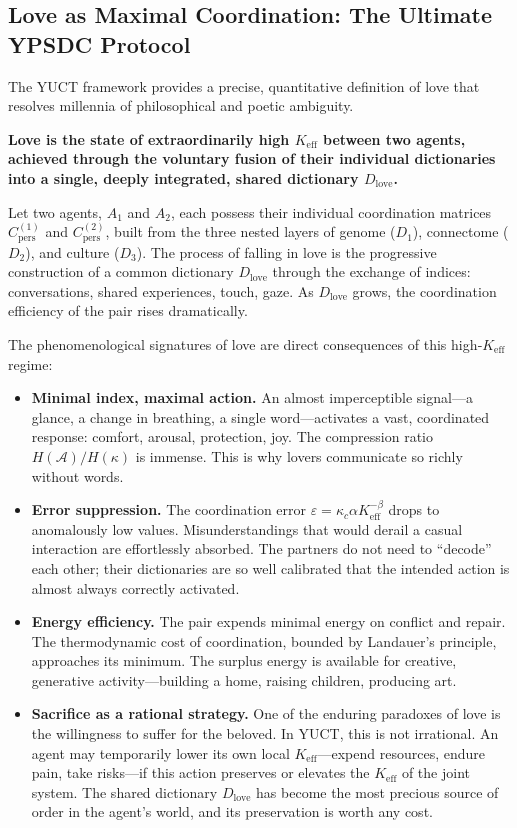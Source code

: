 \documentclass[12pt,a4paper]{article}
\begin{document}
	\subsection{Love as Maximal Coordination: The Ultimate YPSDC Protocol}
	
	The YUCT framework provides a precise, quantitative definition of love that resolves millennia of philosophical and poetic ambiguity.
	
	\textbf{Love is the state of extraordinarily high \(K_{\mathrm{eff}}\) between two agents, achieved through the voluntary fusion of their individual dictionaries into a single, deeply integrated, shared dictionary \(D_{\text{love}}\).}
	
	Let two agents, \(A_1\) and \(A_2\), each possess their individual coordination matrices \(C_{\text{pers}}^{(1)}\) and \(C_{\text{pers}}^{(2)}\), built from the three nested layers of genome (\(D_1\)), connectome (\(D_2\)), and culture (\(D_3\)). The process of falling in love is the progressive construction of a common dictionary \(D_{\text{love}}\) through the exchange of indices: conversations, shared experiences, touch, gaze. As \(D_{\text{love}}\) grows, the coordination efficiency of the pair rises dramatically.
	
	The phenomenological signatures of love are direct consequences of this high‑\(K_{\mathrm{eff}}\) regime:
	
	\begin{itemize}[leftmargin=*]
		\item \textbf{Minimal index, maximal action.} An almost imperceptible signal—a glance, a change in breathing, a single word—activates a vast, coordinated response: comfort, arousal, protection, joy. The compression ratio \(H(\mathcal{A}) / H(\kappa)\) is immense. This is why lovers communicate so richly without words.
		\item \textbf{Error suppression.} The coordination error \(\varepsilon = \kappa_c \alpha K_{\mathrm{eff}}^{-\beta}\) drops to anomalously low values. Misunderstandings that would derail a casual interaction are effortlessly absorbed. The partners do not need to ``decode'' each other; their dictionaries are so well calibrated that the intended action is almost always correctly activated.
		\item \textbf{Energy efficiency.} The pair expends minimal energy on conflict and repair. The thermodynamic cost of coordination, bounded by Landauer's principle, approaches its minimum. The surplus energy is available for creative, generative activity—building a home, raising children, producing art.
		\item \textbf{Sacrifice as a rational strategy.} One of the enduring paradoxes of love is the willingness to suffer for the beloved. In YUCT, this is not irrational. An agent may temporarily lower its own local \(K_{\mathrm{eff}}\)—expend resources, endure pain, take risks—if this action preserves or elevates the \(K_{\mathrm{eff}}\) of the joint system. The shared dictionary \(D_{\text{love}}\) has become the most precious source of order in the agent's world, and its preservation is worth any cost.
	\end{itemize}
	
\end{document}
